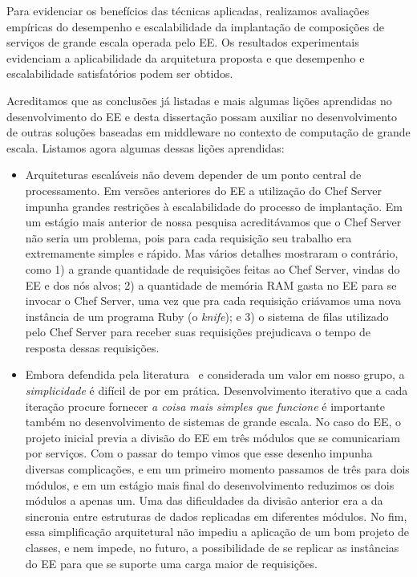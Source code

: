 Para evidenciar os benefícios das técnicas aplicadas,
realizamos avaliações empíricas do desempenho e escalabilidade
da implantação de composições de serviços de grande escala
operada pelo EE.
Os resultados experimentais evidenciam a aplicabilidade da arquitetura proposta
e que desempenho e escalabilidade satisfatórios podem ser obtidos.

Acreditamos que as conclusões já listadas e mais algumas lições aprendidas
no desenvolvimento do EE e desta dissertação
possam auxiliar no desenvolvimento de outras soluções baseadas
em middleware no contexto de computação de grande escala.
Listamos agora algumas dessas lições aprendidas:

\begin{itemize}

\item Arquiteturas escaláveis não devem depender de um ponto central de processamento.
Em versões anteriores do EE a utilização do Chef Server impunha grandes
restrições à escalabilidade do processo de implantação.
Em um estágio mais anterior de nossa pesquisa acreditávamos que o Chef Server
não seria um problema, pois para cada requisição seu trabalho era extremamente simples
e rápido. Mas vários detalhes mostraram o contrário, como 1) a grande
quantidade de requisições feitas ao Chef Server, vindas do EE e dos nós alvos;
2) a quantidade de memória RAM gasta no EE para se invocar o Chef Server,
uma vez que pra cada requisição criávamos uma nova instância de um programa
Ruby (o \emph{knife}); e 3) o sistema de filas utilizado pelo Chef Server
para receber suas requisições prejudicava o tempo de resposta dessas requisições.

\item Embora defendida pela literatura~\cite{Hamilton2007InternetScale}
e considerada um valor em nosso grupo,
a \emph{simplicidade} é difícil de por em prática.
Desenvolvimento iterativo que a cada iteração procure fornecer \emph{a coisa mais simples que funcione}
é importante também no desenvolvimento de sistemas de grande escala.
No caso do EE, o projeto inicial previa a divisão do EE em três módulos
que se comunicariam por serviços. Com o passar do tempo vimos que esse desenho
impunha diversas complicações, e em um primeiro momento passamos de três para dois
módulos, e em um estágio mais final do desenvolvimento reduzimos os dois módulos
a apenas um. Uma das dificuldades da divisão anterior era a da sincronia
entre estruturas de dados replicadas em diferentes módulos.
No fim, essa simplificação arquitetural não impediu a aplicação de um bom projeto
de classes, e nem impede, no futuro, a possibilidade de se replicar as instâncias
do EE para que se suporte uma carga maior de requisições.

\end{itemize}


